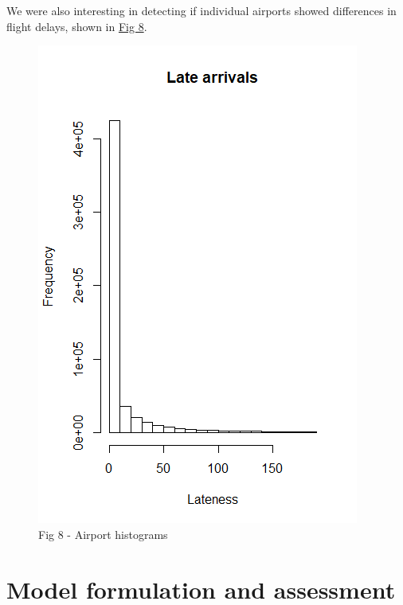 \documentclass[12pt, a4paper]{book}
\newcommand\tab[1][1cm]{\hspace*{#1}}
\begin{document}
			\tab We were also interesting in detecting if individual airports showed differences in flight delays, shown in \underline{Fig 8}. 
			\begin{figure}[h]
	 		\includegraphics[width = 1 \textwidth]{../figures/LateArrivalsHistogram}
	 		\caption{Fig 8 - Airport histograms}
	 		\end{figure}
	 		
\chapter{Model formulation and assessment}
\end{document}
